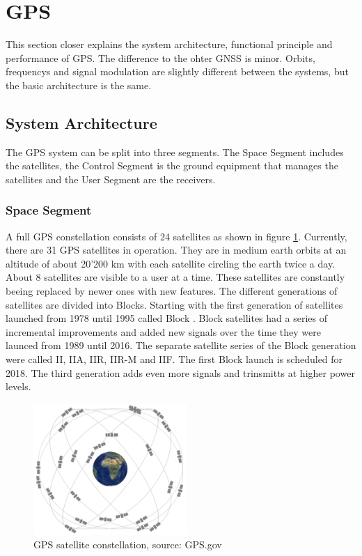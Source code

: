 \section{GPS}

This section closer explains the system architecture, functional principle and performance of GPS.
The difference to the ohter GNSS is minor.
Orbits, frequencys and signal modulation are slightly different between the systems, but the basic architecture is the same.


\subsection{System Architecture}

The GPS system can be split into three segments.
The Space Segment includes the satellites, the Control Segment is the ground equipment that manages the satellites and the User Segment are the receivers.

\subsubsection{Space Segment}

A full GPS constellation consists of 24 satellites as shown in figure \ref{fig:constellation}.
Currently, there are 31 GPS satellites in operation.
They are in medium earth orbits at an altitude of about 20'200 km with each satellite circling the earth twice a day.
About 8 satellites are visible to a user at a time.
These satellites are constantly beeing replaced by newer ones with new features.
The different generations of satellites are divided into Blocks.
Starting with the first generation of satellites launched from 1978 until 1995 called Block .
Block  satellites had a series of incremental improvements and added new signals over the time they were launced from 1989 until 2016.
The separate satellite series of the Block  generation were called II, IIA, IIR, IIR-M and IIF.
The first Block  launch is scheduled for 2018.
The third generation adds even more signals and trinsmitts at higher power levels.

\begin{figure}[ht]
 \centering
 \includegraphics[height=5cm]{images/constellation.jpg}
 \caption{GPS satellite constellation, source: GPS.gov}
 \label{fig:constellation}
\end{figure}

